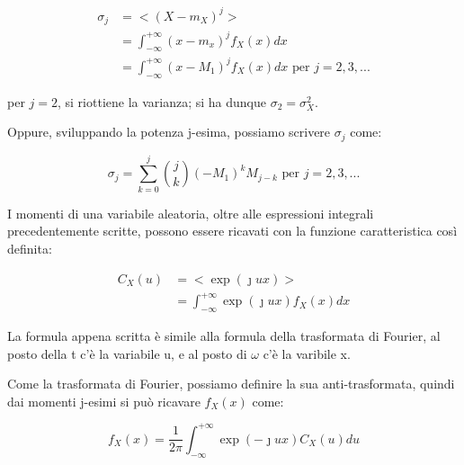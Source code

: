 {
    \Large 
    \begin{equation}
        \begin{split}
            \sigma_j 
            &= 
            <(X - m_X) ^{j}> 
            \\ 
            &=
            \int_{ - \infty}^{+ \infty} 
            (x - m_x)^{j} f_X (x) dx 
            \\ 
            &= 
            \int_{ - \infty}^{+ \infty} 
            (x - M_1)^{j} f_X (x) dx 
            \text{ per } 
            j = 2, 3, ...
        \end{split}
    \end{equation}
}

per $j = 2$, si riottiene la varianza; 
si ha dunque 
$\sigma_2 = \sigma_X ^{2}$. \newline 

Oppure, sviluppando la potenza j-esima, possiamo scrivere $\sigma_j$ come: 

{
    \Large 
    \begin{equation}
        \sigma_j 
        = 
        \sum_{k = 0}^{j} 
        \binom{j}{k} 
        (-M_1) ^{k} 
        M_{j -k} 
        \text{ per }
        j = 2, 3, ...
    \end{equation}
}

I momenti di una variabile aleatoria, 
oltre alle espressioni integrali precedentemente scritte, possono essere ricavati con 
la funzione caratteristica così definita: 

{
    \Large 
    \begin{equation}
        \begin{split}
            C_X (u) 
            &= 
            <\exp(\jmath u x)>    
            \\ 
            &= 
            \int_{- \infty}^{+ \infty} 
            \exp(\jmath u x) 
            f_X (x) dx
        \end{split}
    \end{equation}
}

La formula appena scritta è simile alla formula della trasformata di Fourier, 
al posto della t c'è la variabile u, e al posto di $\omega$ c'è la varibile x. \newline

Come la trasformata di Fourier, possiamo definire la sua anti-trasformata, quindi dai momenti j-esimi 
si può ricavare $f_X (x)$ come: 

{
    \Large 
    \begin{equation}
        f_X (x)
        = 
        \frac{1}{2\pi}
        \int_{-\infty}^{+ \infty} 
        \exp(- \jmath u x) C_X (u) du
    \end{equation}
} 

